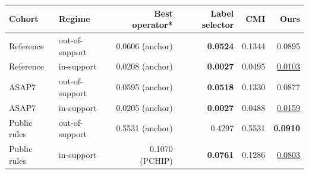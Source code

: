 \scriptsize
\setlength{\tabcolsep}{3pt}
\begin{tabular*}{\linewidth}{@{\extracolsep{\fill}}llrrrr@{}}\toprule
Cohort & Regime & Best operator* & Label selector & CMI & \textbf{Ours} \\
\midrule
Reference & out-of-support & 0.0606 (anchor) & \textbf{0.0524} & 0.1344 & 0.0895 \\
Reference & in-support & 0.0208 (anchor) & \textbf{0.0027} & 0.0495 & \underline{0.0103} \\
ASAP7 & out-of-support & 0.0595 (anchor) & \textbf{0.0518} & 0.1330 & 0.0877 \\
ASAP7 & in-support & 0.0205 (anchor) & \textbf{0.0027} & 0.0488 & \underline{0.0159} \\
Public rules & out-of-support & 0.5531 (anchor) & 0.4297 & 0.5531 & \textbf{0.0910} \\
Public rules & in-support & 0.1070 (PCHIP) & \textbf{0.0761} & 0.1286 & \underline{0.0803} \\
\bottomrule\end{tabular*}
